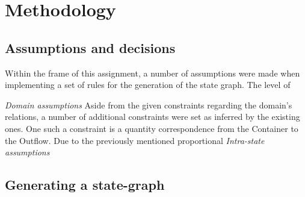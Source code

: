 \section{Methodology}

\subsection{Assumptions and decisions}
Within the frame of this assignment, a number of assumptions were made when
implementing a set of rules for the generation of the state graph. The level of

\textit{Domain assumptions}
Aside from the given constraints regarding the domain's relations, a number of
additional constraints were set as inferred by the existing ones. One such a
constraint is a quantity correspondence from the Container to the Outflow. Due
to the previously mentioned proportional
\textit{Intra-state assumptions}




\subsection{Generating a state-graph}